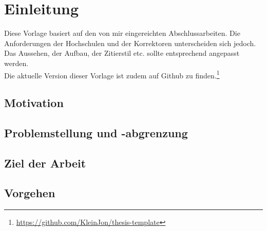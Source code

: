 \chapter[Einleitung]{Einleitung}
\label{chap:introduction}
Diese Vorlage basiert auf den von mir eingereichten Abschlussarbeiten. Die Anforderungen der Hochschulen und der Korrektoren unterscheiden sich jedoch. Das Aussehen, der Aufbau, der Zitierstil etc. sollte entsprechend angepasst werden.\\
Die aktuelle Version dieser Vorlage ist zudem auf Github zu finden.\footnote{\url{https://github.com/KleinJon/thesis-template}}

\section{Motivation}

\section{Problemstellung und -abgrenzung}

\section{Ziel der Arbeit}

\section{Vorgehen}
